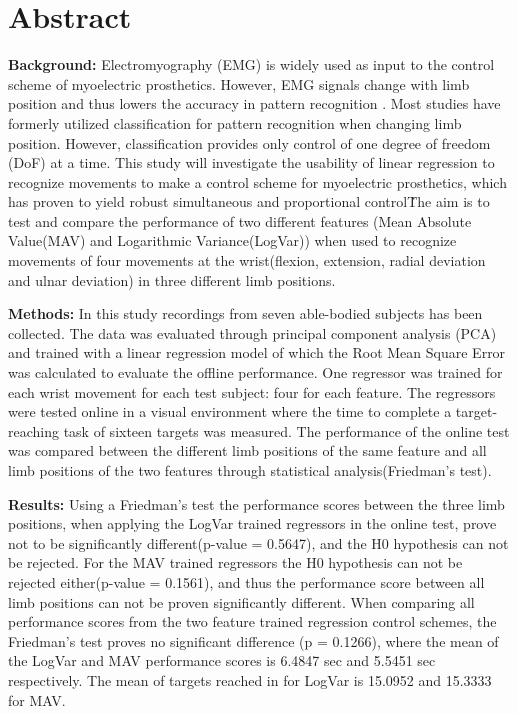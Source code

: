 \section{Abstract}

\textbf{Background:} Electromyography (EMG) is widely used as input to the control scheme of myoelectric prosthetics. However, EMG signals change with limb position and thus lowers the accuracy in pattern recognition \cite{Fougner2010}.%
Most studies have formerly utilized classification for pattern recognition when changing limb position.  
However, classification provides only control of one degree of freedom (DoF) at a time. This study will investigate the usability of linear regression to recognize movements to make a control scheme for myoelectric prosthetics, which has proven to yield robust simultaneous and proportional control\cite{hahne2014}\. The aim is to test and compare the performance of two different features (Mean Absolute Value(MAV) and Logarithmic Variance(LogVar)) when used to recognize movements of four movements at the wrist(flexion, extension, radial deviation and ulnar deviation) in three different limb positions. 


\textbf{Methods:} In this study recordings from seven able-bodied subjects has been collected. The data was evaluated through principal component analysis (PCA) and trained with a linear regression model of which the Root Mean Square Error was calculated to evaluate the offline performance. One regressor was trained for each wrist movement for each test subject: four for each feature. The regressors were tested online in a visual environment where the time to complete a target-reaching task of sixteen targets was measured. The performance of the online test was compared between the different limb positions of the same feature and all limb positions of the two features through statistical analysis(Friedman's test).


\textbf{Results:} 
Using a Friedman's test the performance scores between the three limb positions, when applying the LogVar trained regressors in the online test, prove not to be significantly different(p-value = 0.5647), and the H0 hypothesis can not be rejected. For the MAV trained regressors the H0 hypothesis can not be rejected either(p-value = 0.1561), and thus the performance score between all limb positions can not be proven significantly different. When comparing all performance scores from the two feature trained regression control schemes, the Friedman's test proves no significant difference (p = 0.1266), where the mean of the LogVar and MAV performance scores is 6.4847 sec and 5.5451 sec respectively. The mean of targets reached in for LogVar is 15.0952 and 15.3333 for MAV.

